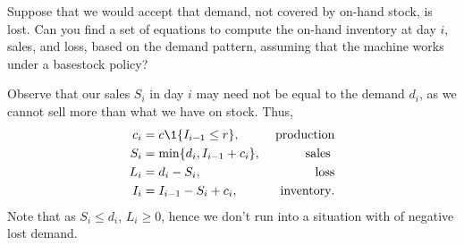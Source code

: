 




\begin{exercise}\label{ex:4}
Suppose that we would accept that demand, not covered by on-hand stock, is lost.  Can you find a set of equations to compute the on-hand inventory at day $i$, sales, and loss, based on the demand pattern, assuming that the machine works under a basestock policy?
  \begin{solution}
Observe that our sales $S_i$ in day $i$ may need not be equal to the demand $d_i$,  as we cannot sell more than what we have on stock. Thus,
    \begin{align*}
      c_i &= c \1{I_{i-1} \leq r}, &\text{ production} \\
      S_i &= \min\{d_i, I_{i-1}+c_i\}, &\text{sales }\\
      L_i &= d_i - S_i, & \text{loss}\\
      I_i &= I_{i-1} -S_i + c_i,  &\text{inventory}.
    \end{align*}
 Note that as $S_i \leq d_i$, $L_i \geq 0$, hence we don't run into a situation with of negative lost
    demand.
  \end{solution}
\end{exercise}


